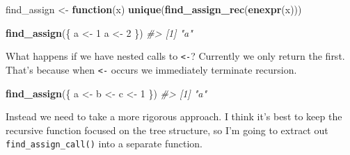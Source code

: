 \documentclass[]{book}
\newenvironment{Shaded}{\begin{snugshade}}{\end{snugshade}}
\newcommand{\CommentTok}[1]{\textcolor[rgb]{0.37,0.37,0.37}{\textit{#1}}}
\newcommand{\ControlFlowTok}[1]{\textcolor[rgb]{0.27,0.27,0.27}{\textbf{#1}}}
\newcommand{\DecValTok}[1]{\textcolor[rgb]{0.06,0.06,0.06}{#1}}
\newcommand{\KeywordTok}[1]{\textcolor[rgb]{0.27,0.27,0.27}{\textbf{#1}}}
\newcommand{\NormalTok}[1]{#1}
\newcommand{\StringTok}[1]{\textcolor[rgb]{0.5,0.5,0.5}{#1}}
\begin{document}
\begin{Shaded}
\begin{Highlighting}[]
\NormalTok{find_assign <-}\StringTok{ }\ControlFlowTok{function}\NormalTok{(x) }\KeywordTok{unique}\NormalTok{(}\KeywordTok{find_assign_rec}\NormalTok{(}\KeywordTok{enexpr}\NormalTok{(x)))}

\KeywordTok{find_assign}\NormalTok{(\{}
\NormalTok{  a <-}\StringTok{ }\DecValTok{1}
\NormalTok{  a <-}\StringTok{ }\DecValTok{2}
\NormalTok{\})}
\CommentTok{#> [1] "a"}
\end{Highlighting}
\end{Shaded}

What happens if we have nested calls to \texttt{\textless{}-}? Currently we only return the first. That's because when \texttt{\textless{}-} occurs we immediately terminate recursion.

\begin{Shaded}
\begin{Highlighting}[]
\KeywordTok{find_assign}\NormalTok{(\{}
\NormalTok{  a <-}\StringTok{ }\NormalTok{b <-}\StringTok{ }\NormalTok{c <-}\StringTok{ }\DecValTok{1}
\NormalTok{\})}
\CommentTok{#> [1] "a"}
\end{Highlighting}
\end{Shaded}

Instead we need to take a more rigorous approach. I think it's best to keep the recursive function focused on the tree structure, so I'm going to extract out \texttt{find\_assign\_call()} into a separate function.
\end{document}
